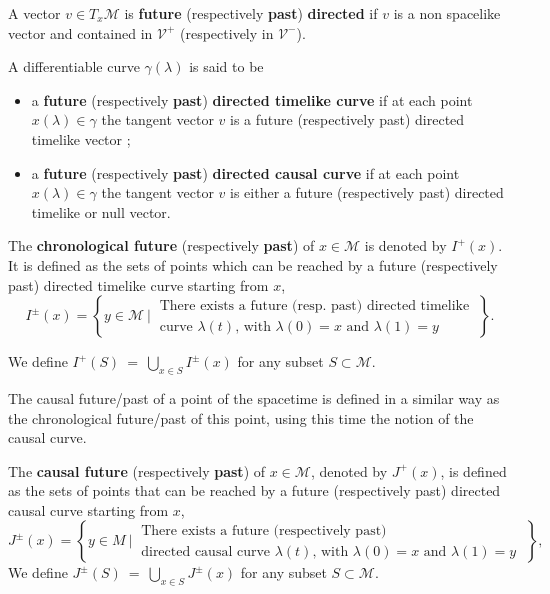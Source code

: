 \documentclass[12pt]{book}
\newcommand{\Mcal}{\mathcal{M}}
\newcommand{\Vcal}{\mathcal{V}}
\theoremstyle{break}
\newtheorem{definition}{Definition}
\begin{document}
A vector $v \in T_x\Mcal$ is \textbf{future} (respectively \textbf{past}) \textbf{directed} if $v$ is a non spacelike vector and contained in $\Vcal^+$ (respectively in $\Vcal^-$). 




A differentiable curve $\gamma(\lambda)$ is said to be 
\begin{itemize}
\item a \textbf{future} (respectively \textbf{past}) \textbf{directed timelike curve} if at each point $x(\lambda) \in \gamma$ the tangent vector $v$ is a future (respectively past) directed timelike vector ;
\item a \textbf{future} (respectively \textbf{past}) \textbf{directed causal curve} if at each point $x(\lambda) \in \gamma$ the tangent vector $v$ is either a future (respectively past) directed timelike or null vector. 
\end{itemize}


The \textbf{chronological future} (respectively \textbf{past}) of $x \in \Mcal$ is denoted by $I^{+}(x)$. It is defined as the sets of points which can be reached by a future (respectively past) directed timelike curve starting from $x$,
%
\begin{equation*}
I^{\pm}(x) = \left\{ y \in \Mcal \ \bigg| \ \begin{array}{l} \text{There exists a future (resp. past) directed timelike} \\ \text{curve $\lambda(t)$, with $\lambda(0)=x$ and $\lambda(1)=y$} \end{array} \ \right\}.
\end{equation*}

We define $I^{+}(S) \ = \ \bigcup_{x \in S} I^{\pm}(x)$ for any subset $S \subset \Mcal$.
%


The causal future/past of a point of the spacetime is defined in a similar way as the chronological future/past of this point, using this time the notion of the causal curve.


%
The \textbf{causal future} (respectively \textbf{past}) of $x \in \Mcal$, denoted by $J^{+}(x)$, is defined as the sets of points that can be reached by a future (respectively past) directed causal curve starting from $x$,
%
\begin{equation*}
J^{\pm}(x) = \left\{ y \in M \ \bigg| \ \begin{array}{l} \text{There exists a future (respectively past)} \\ \text{directed causal curve $\lambda(t)$, with $\lambda(0)=x$ and $\lambda(1)=y$} \end{array} \; \right\},
\end{equation*}
We define $J^{\pm}(S) \ = \ \bigcup_{x \in S} J^{\pm}(x)$ for any subset $S \subset \Mcal$.
%
\end{document}

